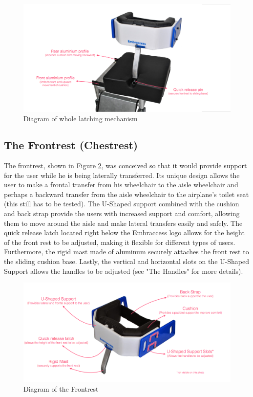 \begin{figure}[h]
\centering
\includegraphics[width=13cm]{images/AisleWheelchair5.png}
\caption{Diagram of whole latching mechanism}
\label{fig:base}
\end{figure}

\subsection{The Frontrest (Chestrest)}
The frontrest, shown in Figure \ref{fig:frontrest},  was conceived so that it would provide support for the user while he is being laterally transferred. Its unique design allows the user to make a frontal transfer from his wheelchair to the aisle wheelchair and perhaps a backward transfer from the aisle wheelchair to the airplane's toilet seat (this still has to be tested). The U-Shaped support combined with the cushion and back strap provide the users with increased support and comfort, allowing them to move around the aisle and make lateral transfers easily and safely. The quick release latch located right below the Embraccess logo allows for the height of the front rest to be adjusted, making it flexible for different types of users. Furthermore, the rigid mast made of aluminum securely attaches the front rest to the sliding cushion base. Lastly, the vertical and horizontal slots on the U-Shaped Support allows the handles to be adjusted (see "The Handles" for more details).

\begin{figure}[h]
\centering
\includegraphics[width=13cm]{images/AisleWheelchair6.png}
\caption{Diagram of the Frontrest}
\label{fig:frontrest}
\end{figure}

